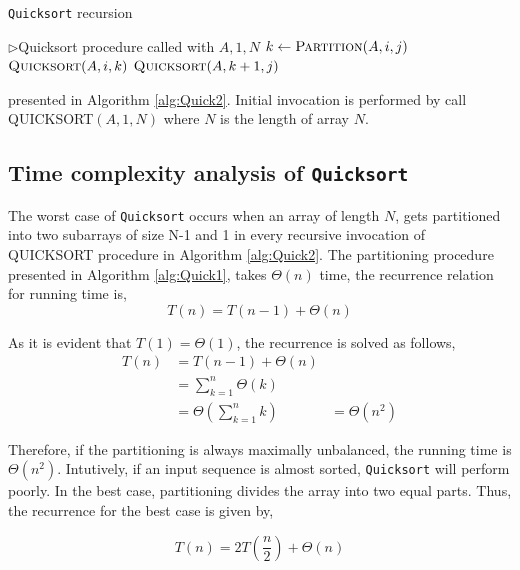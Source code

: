 \documentclass[10pt]{article}
\begin{document}
\begin{multicols*}{2}
\begin{algorithm}[H]
\caption{ \texttt{Quicksort}  recursion}\label{alg:Quick2}
\begin{algorithmic}[1]
\State \(\triangleright\)Quicksort procedure called with $A, 1, N$
  	\State $k \gets \textsc{Partition}(A,i,j)$
    \State $\textsc{Quicksort}(A,i,k)$
    \State $\textsc{Quicksort}(A,k+1,j)$
\EndIf
\EndProcedure
\end{algorithmic}
\end{algorithm}

presented in Algorithm \ref{alg:Quick2}. Initial invocation is performed
by call QUICKSORT$(A, 1, N)$ where $N$ is
the length of array $N$.

\subsection{ Time complexity analysis of
\texttt{Quicksort}}

The worst case of \texttt{Quicksort} occurs when an array
of length $N$, gets partitioned into two subarrays
of size N-1 and 1 in every recursive invocation of
QUICKSORT procedure in Algorithm \ref{alg:Quick2}. The partitioning procedure presented in Algorithm \ref{alg:Quick1}, takes
$\Theta(n)$ time, the recurrence relation for running time
is,
\begin{equation*}
T(n) = T(n-1) + \Theta(n)
\end{equation*}

As it is evident that $T(1) = \Theta(1)$, the recurrence is
solved as follows,
\begin{align*}
T(n) &= T(n-1) + \Theta(n)\\
&= \sum_{k=1}^n\Theta(k) \\ 
&= \Theta \left ( \sum_{k=1}^n k \right )
&= \Theta(n^2) 
\end{align*}

Therefore, if the partitioning is always maximally
unbalanced, the running time is $\Theta(n^2)$. Intutively,
if an input sequence is almost sorted, \texttt{Quicksort}
will perform poorly. In the best case, partitioning
divides the array into two equal parts. Thus, the
recurrence for the best case is given by, 

\begin{equation*}
T(n) = 2T(\frac{n}{2}) + \Theta(n)
\end{equation*}


\end{multicols*}
\end{document}
